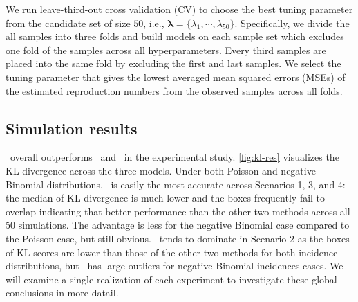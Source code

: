 We run leave-third-out cross validation (CV) to choose the best tuning parameter
from the candidate set of size $50$, i.e., $\boldsymbol{\lambda} = \{\lambda_1,
\cdots, \lambda_{50}\}$. Specifically, we divide the all samples into three
folds and build models on each sample set which excludes one fold of the samples
across all hyperparameters. Every third samples are placed into the same fold by
excluding the first and last samples. We select the tuning parameter that gives
the lowest averaged mean squared errors (MSEs)  of the estimated reproduction numbers from the observed
samples across all folds. 


\subsection{Simulation results}


\RtEstim\ overall outperforms \EpiEstim\ and \EpiLPS\ in the experimental study.
\autoref{fig:kl-res} visualizes the KL divergence across the three models. Under
both Poisson and negative Binomial distributions, \RtEstim\ is easily the most
accurate across Scenarios 1, 3, and 4: the median of KL divergence is much lower
and the boxes frequently fail to overlap indicating that better performance than
the other two methods across all 50 simulations. The advantage is less for the
negative Binomial case compared to the Poisson case, but still obvious. \EpiLPS\
tends to dominate in Scenario 2 as the boxes of KL scores are lower than those
of the other two methods for both incidence distributions, but \EpiLPS\ has
large outliers for negative Binomial incidences cases. We will examine a single
realization of each experiment to investigate these global conclusions in more
datail.

